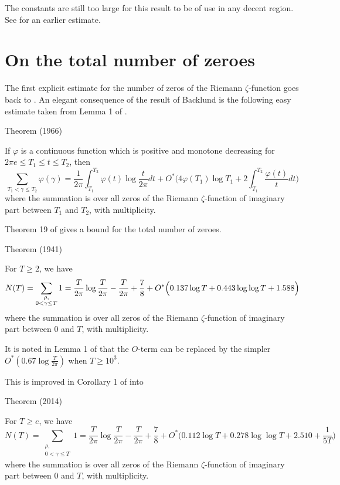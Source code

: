 The constants are still too large for this result to be of use in any decent
region. See \cite{Kulas*94} for an
earlier estimate.





\par 
\section{On the total number of zeroes}


The first explicit estimate for the number of zeros of the Riemann
$\zeta$-function goes back to
\cite{Backlund*14}.
An elegant consequence of the result of Backlund is the following easy
estimate taken from Lemma 1 of
\cite{Lehman*66a}.

\begin{thm}{Theorem (1966)}

If $\varphi$ is a continuous function which is positive and monotone
decreasing for $2\pi e\le T_1\le t\le T_2$, then
$$
\sum_{T_1 < \gamma\le T_2} \varphi(\gamma)
            =\frac{1}{2\pi}\int_{T_1}^{T_2}\varphi(t)\log\frac{t}{2\pi}dt
            +O^*\biggl(4\varphi(T_1)\log
            T_1+2\int_{T_1}^{T_2}\frac{\varphi(t)}{t}
            dt\biggr)
            $$
             where the summation is over all zeros of the Riemann
            $\zeta$-function of
            imaginary part between $T_1$ and $T_2$, with multiplicity.
\end{thm}


Theorem 19 of
\cite{Rosser*41}
gives a bound for the total number of zeroes.

\begin{thm}{Theorem (1941)}

For $T\ge2$, we have
$$
N(T)=\sum_{\substack{\rho,\\ 0 < \gamma\le T}} 1=
            \frac{T}{2\pi}\log\frac{T}{2\pi}-\frac{T}{2\pi}+\frac{7}{8}
            +O^*\Bigl(0.137\log T+0.443\log\log T+1.588
            \Bigr)
            $$
            where the summation is over all zeros of the Riemann
            $\zeta$-function of
            imaginary part between 0 and $T$, with multiplicity.
\end{thm}


It is noted in Lemma 1 of
\cite{Ramare-Saouter*02}
that the $O$-term can be replaced by the simpler
$O^*(0.67\log\frac{T}{2\pi})$ when $T\ge 10^3$.

This is improved in Corollary 1 of
\cite{Trudgian*13}
into
\begin{thm}{Theorem (2014)}

For $T\ge e$, we have
$$
N(T)=\sum_{\substack{\rho,\\ 0 < \gamma\le T}} 1=
            \frac{T}{2\pi}\log\frac{T}{2\pi}-\frac{T}{2\pi}+\frac{7}{8}
            +O^*\bigl(0.112\log T+0.278\log\log T+2.510+\frac{1}{5T}
            \bigr)
            $$
            where the summation is over all zeros of the Riemann
            $\zeta$-function of
            imaginary part between 0 and $T$, with multiplicity.
\end{thm}



